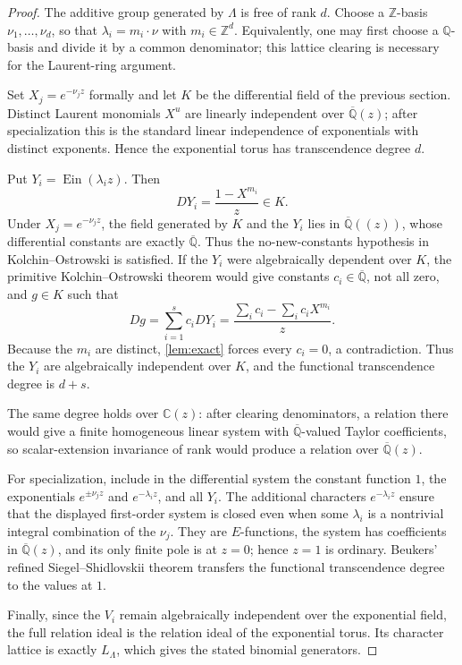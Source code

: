 \documentclass[11pt]{article}
\theoremstyle{definition}
\theoremstyle{remark}
\newcommand{\Q}{\mathbb Q}
\newcommand{\Qb}{\overline{\mathbb Q}}
\newcommand{\Qbar}{\overline{\mathbb Q}}
\newcommand{\C}{\mathbb C}
\newcommand{\Z}{\mathbb Z}
\newcommand{\Ein}{\operatorname{Ein}}
\begin{document}
\begin{proof}
The additive group generated by \(\Lambda\) is free of rank \(d\).  Choose a
\(\Z\)-basis \(\nu_1,\ldots,\nu_d\), so that
\(\lambda_i=m_i\cdot\nu\) with \(m_i\in\Z^d\).  Equivalently, one may first
choose a \(\Q\)-basis and divide it by a common denominator; this lattice
clearing is necessary for the Laurent-ring argument.

Set \(X_j=e^{-\nu_jz}\) formally and let \(K\) be the differential field of
the previous section.  Distinct Laurent monomials \(X^u\) are linearly
independent over \(\Qb(z)\); after specialization this is the standard linear
independence of exponentials with distinct exponents.  Hence the exponential
torus has transcendence degree \(d\).

Put \(Y_i=\Ein(\lambda_i z)\).  Then
\[
 DY_i=\frac{1-X^{m_i}}{z}\in K.
\]
Under \(X_j=e^{-\nu_jz}\), the field generated by \(K\) and the \(Y_i\)
lies in \(\Qbar((z))\), whose differential constants are exactly
\(\Qbar\).  Thus the no-new-constants hypothesis in
Kolchin--Ostrowski is satisfied.
If the \(Y_i\) were algebraically dependent over \(K\), the primitive
Kolchin--Ostrowski theorem would give constants \(c_i\in\Qb\), not all zero,
and \(g\in K\) such that
\[
 Dg=\sum_{i=1}^s c_iDY_i
 =\frac{\sum_i c_i-\sum_i c_iX^{m_i}}{z}.
\]
Because the \(m_i\) are distinct, \cref{lem:exact} forces every \(c_i=0\), a
contradiction.  Thus the \(Y_i\) are algebraically independent over \(K\),
and the functional transcendence degree is \(d+s\).

The same degree holds over \(\C(z)\): after clearing denominators, a
relation there would give a finite homogeneous linear system with
\(\Qbar\)-valued Taylor coefficients, so scalar-extension invariance of
rank would produce a relation over \(\Qbar(z)\).

For specialization, include in the differential system the constant function
\(1\), the exponentials \(e^{\pm\nu_jz}\) and
\(e^{-\lambda_i z}\), and all \(Y_i\).  The additional characters
\(e^{-\lambda_i z}\) ensure that the displayed first-order system is closed
even when some \(\lambda_i\) is a nontrivial integral combination of the
\(\nu_j\).  They are
\(E\)-functions, the system has coefficients in \(\Qb(z)\), and its only
finite pole is at \(z=0\); hence \(z=1\) is ordinary.  Beukers' refined
Siegel--Shidlovskii theorem transfers the functional transcendence degree to
the values at \(1\).

Finally, since the \(V_i\) remain algebraically independent over the
exponential field, the full relation ideal is the relation ideal of the
exponential torus.  Its character lattice is exactly \(L_\Lambda\), which
gives the stated binomial generators.
\end{proof}
\end{document}
